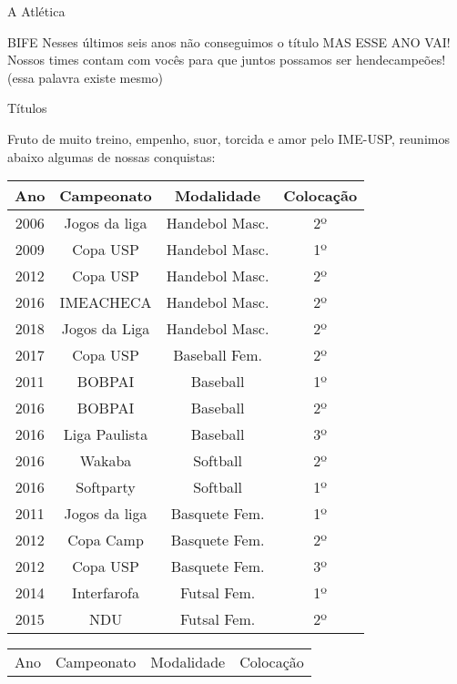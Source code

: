 \begin{secao}{A Atlética}
\begin{subsecao}{BIFE}
Nesses últimos seis anos não conseguimos o título MAS ESSE ANO VAI! Nossos 
times contam com vocês para que juntos possamos ser hendecampeões! (essa
palavra existe mesmo)

\end{subsecao}
\begin{subsecao}{Títulos}

Fruto de muito treino, empenho, suor, torcida e amor pelo IME-USP, reunimos
abaixo algumas de nossas conquistas:

\begin{center}
  \begin{tabular}{c|c|c|c}
    Ano & Campeonato & Modalidade & Colocação\\
    \hline
    2006 & Jogos da liga  & Handebol Masc.  & 2º\\
    2009 & Copa USP       & Handebol Masc.  & 1º\\
    2012 & Copa USP       & Handebol Masc.  & 2º\\
    2016 & IMEACHECA      & Handebol Masc.  & 2º\\
    2018 & Jogos da Liga  & Handebol Masc.  & 2º\\
    2017 & Copa USP       & Baseball Fem.   & 2º\\
    2011 & BOBPAI         & Baseball        & 1º\\
    2016 & BOBPAI         & Baseball        & 2º\\
    2016 & Liga Paulista  & Baseball        & 3º\\
    2016 & Wakaba         & Softball        & 2º\\
    2016 & Softparty      & Softball        & 1º\\
    2011 & Jogos da liga  & Basquete Fem.   & 1º\\
    2012 & Copa Camp      & Basquete Fem.   & 2º\\
    2012 & Copa USP       & Basquete Fem.   & 3º\\
    2014 & Interfarofa    & Futsal Fem.     & 1º\\
    2015 & NDU            & Futsal Fem.     & 2º\\
  \end{tabular}
\end{center}
\begin{center}
  \begin{tabular}{c|c|c|c}
    Ano & Campeonato & Modalidade & Colocação\\

\end{tabular}
\end{center}
\end{subsecao}
\end{secao}
